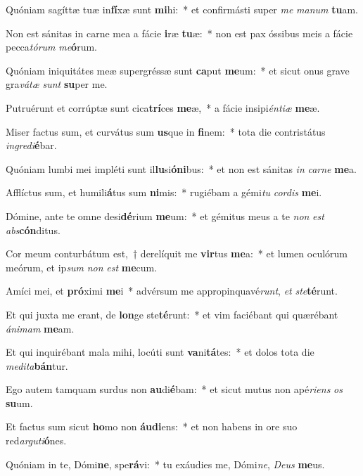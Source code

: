 \item Quóniam sagíttæ tuæ in\textbf{fí}xæ sunt \textbf{mi}hi:~* et confirmásti super \textit{me} \textit{ma}\textit{num} \textbf{tu}am.
\item Non est sánitas in carne mea a fácie \textbf{i}ræ \textbf{tu}æ:~* non est pax óssibus meis a fácie pecca\textit{tó}\textit{rum} \textit{me}\textbf{ó}rum.
\item Quóniam iniquitátes meæ supergréssæ sunt \textbf{ca}put \textbf{me}um:~* et sicut onus grave gra\textit{vá}\textit{tæ} \textit{sunt} \textbf{su}per me.
\item Putruérunt et corrúptæ sunt cica\textbf{trí}ces \textbf{me}æ,~* a fácie insipi\textit{én}\textit{ti}\textit{æ} \textbf{me}æ.
\item Miser factus sum, et curvátus sum \textbf{us}que in \textbf{fi}nem:~* tota die contristátus \textit{in}\textit{gre}\textit{di}\textbf{é}bar.
\item Quóniam lumbi mei impléti sunt il\textbf{lu}si\textbf{ó}\textbf{ni}bus:~* et non est sánitas \textit{in} \textit{car}\textit{ne} \textbf{me}a.
\item Afflíctus sum, et humili\textbf{á}tus sum \textbf{ni}mis:~* rugiébam a gémi\textit{tu} \textit{cor}\textit{dis} \textbf{me}i.
\item Dómine, ante te omne desi\textbf{dé}rium \textbf{me}um:~* et gémitus meus a te \textit{non} \textit{est} \textit{abs}\textbf{cón}ditus.
\item Cor meum conturbátum est,~† derelíquit me \textbf{vir}tus \textbf{me}a:~* et lumen oculórum meórum, et ip\textit{sum} \textit{non} \textit{est} \textbf{me}cum.
\item Amíci mei, et \textbf{pró}ximi \textbf{me}i~* advérsum me appropinquavé\textit{runt}, \textit{et} \textit{ste}\textbf{té}runt.
\item Et qui juxta me erant, de \textbf{lon}ge ste\textbf{té}runt:~* et vim faciébant qui quærébant \textit{á}\textit{ni}\textit{mam} \textbf{me}am.
\item Et qui inquirébant mala mihi, locúti sunt \textbf{va}ni\textbf{tá}tes:~* et dolos tota die \textit{me}\textit{di}\textit{ta}\textbf{bán}tur.
\item Ego autem tamquam surdus non \textbf{au}di\textbf{é}bam:~* et sicut mutus non apé\textit{ri}\textit{ens} \textit{os} \textbf{su}um.
\item Et factus sum sicut \textbf{ho}mo non \textbf{áu}\textbf{di}ens:~* et non habens in ore suo red\textit{ar}\textit{gu}\textit{ti}\textbf{ó}nes.
\item Quóniam in te, Dómi\textbf{ne}, spe\textbf{rá}vi:~* tu exáudies me, Dómi\textit{ne}, \textit{De}\textit{us} \textbf{me}us.
